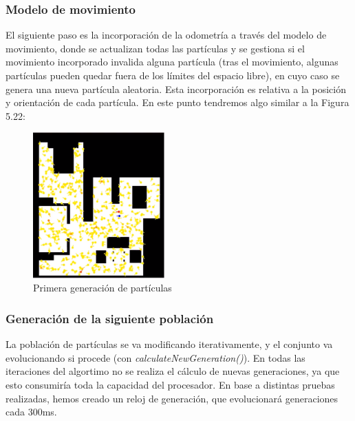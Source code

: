 \subsubsection{Modelo de movimiento}
El siguiente paso es la incorporación de la odometría a través del modelo de movimiento, donde se actualizan todas las partículas y se gestiona si el movimiento incorporado invalida alguna partícula (tras el movimiento, algunas partículas pueden quedar fuera de los límites del espacio libre), en cuyo caso se genera una nueva partícula aleatoria. Esta incorporación es relativa a la posición y orientación de cada partícula. En este punto tendremos algo similar a la Figura 5.22:

\begin{figure}[H]
\begin{center}
	\includegraphics[width=0.45\textwidth]{figures/primerageneracion.png}
	\caption{Primera generación de partículas}
	\label{fig.primerageneracion}
	\end{center}
\end{figure}  

\subsubsection{Generación de la siguiente población}
La población de partículas se va modificando iterativamente, y el conjunto va evolucionando si procede (con \textit{calculateNewGeneration()}). En todas las iteraciones del algortimo no se realiza el cálculo de nuevas generaciones, ya que esto consumiría toda la capacidad del procesador. En base a distintas pruebas realizadas, hemos creado un reloj de generación, que evolucionará generaciones cada 300ms.

